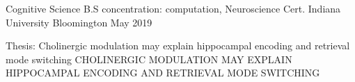 
\begin{cventries}

  \cventry
    {Cognitive Science B.S concentration: computation, Neuroscience Cert.} %
    {Indiana University Bloomington} %
    {} %
    {May 2019} %
    {
      \begin{cvitems} %
	\item{Thesis: Cholinergic modulation may explain hippocampal encoding and retrieval mode switching
	CHOLINERGIC MODULATION MAY EXPLAIN HIPPOCAMPAL ENCODING AND RETRIEVAL MODE SWITCHING}
      \end{cvitems}
    }


\end{cventries}
